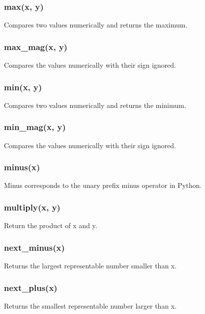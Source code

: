 \subsubsection{max(x, y)}

Compares two values numerically and returns the maximum.

\subsubsection{max\_mag(x, y)}

Compares the values numerically with their sign ignored.

\subsubsection{min(x, y)}

Compares two values numerically and returns the minimum.

\subsubsection{min\_mag(x, y)}

Compares the values numerically with their sign ignored.

\subsubsection{minus(x)}

Minus corresponds to the unary prefix minus operator in Python.

\subsubsection{multiply(x, y)}

Return the product of x and y.

\subsubsection{next\_minus(x)}

Returns the largest representable number smaller than x.

\subsubsection{next\_plus(x)}

Returns the smallest representable number larger than x.

